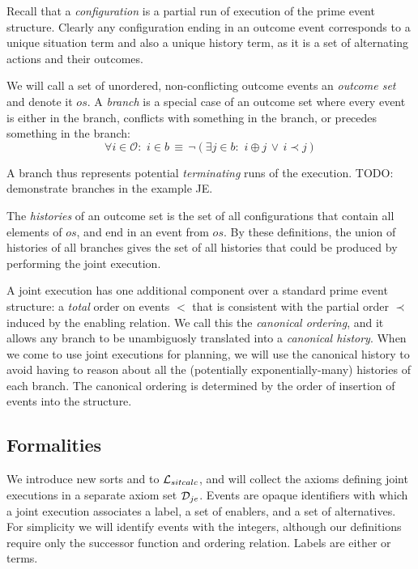 Recall that a \emph{configuration} is a partial run of execution of
the prime event structure. Clearly any configuration ending in an
outcome event corresponds to a unique situation term and also a unique
history term, as it is a set of alternating actions and their outcomes.

We will call a set of unordered, non-conflicting outcome events an
\emph{outcome set} and denote it $os$. A \emph{branch} is a special
case of an outcome set where every event is either in the branch,
conflicts with something in the branch, or precedes something in the
branch: \[
\forall i\in\mathcal{O}:\,\, i\in b\,\equiv\,\neg(\exists j\in b:\,\, i\oplus j\,\vee\, i\prec j)\]


A branch thus represents potential \emph{terminating} runs of the
execution. TODO: demonstrate branches in the example JE.

The \emph{histories} of an outcome set is the set of all configurations
that contain all elements of $os$, and end in an event from $os$.
By these definitions, the union of histories of all branches gives
the set of all histories that could be produced by performing the
joint execution.

A joint execution has one additional component over a standard prime
event structure: a \emph{total} order on events $<$ that is consistent
with the partial order $\prec$ induced by the enabling relation.
We call this the \emph{canonical ordering}, and it allows any branch
to be unambiguosly translated into a \emph{canonical history}. When
we come to use joint executions for planning, we will use the canonical
history to avoid having to reason about all the (potentially exponentially-many)
histories of each branch. The canonical ordering is determined by
the order of insertion of events into the structure.


\subsection{Formalities}

We introduce new sorts and  to $\mathcal{L}_{sitcalc}$,
and will collect the axioms defining joint executions in a separate
axiom set $\mathcal{D}_{je}$. Events are opaque identifiers with which a
joint execution associates a label, a set of enablers, and a set of
alternatives. For simplicity we will identify events with the integers,
although our definitions require only the successor function and ordering
relation. Labels are either  or  terms.


